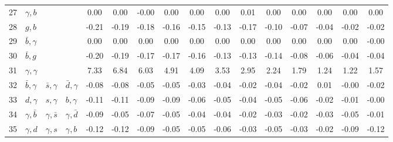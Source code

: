\begin{tabularx}{\textwidth}{rXXX@{}S@{}S@{}S@{}S@{}S@{}S@{}S@{}S@{}S@{}S@{}S@{}S}
 27 & $\gamma, b$      &                  &                 &  0.00 &  0.00 & -0.00 &  0.00 &  0.00 &  0.00 &  0.01 &  0.00 &  0.00 &  0.00 &  0.00 &  0.00 \\
 28 & $g,b$            &                  &                 & -0.21 & -0.19 & -0.18 & -0.16 & -0.15 & -0.13 & -0.17 & -0.10 & -0.07 & -0.04 & -0.02 & -0.02 \\
 29 & $\bar b,\gamma$  &                  &                 &  0.00 &  0.00 &  0.00 &  0.00 &  0.00 &  0.00 &  0.00 &  0.00 &  0.00 &  0.00 &  0.00 & -0.00 \\
 30 & $\bar b,g$       &                  &                 & -0.20 & -0.19 & -0.17 & -0.17 & -0.16 & -0.13 & -0.13 & -0.14 & -0.08 & -0.06 & -0.04 & -0.04 \\
 31 & $\gamma,\gamma$  &                  &                 &  7.33 &  6.84 &  6.03 &  4.91 &  4.09 &  3.53 &  2.95 &  2.24 &  1.79 &  1.24 &  1.22 &  1.57 \\
 32 & $\bar b,\gamma$  & $\bar s,\gamma$  & $\bar d,\gamma$ & -0.08 & -0.08 & -0.05 & -0.05 & -0.03 & -0.04 & -0.02 & -0.04 & -0.02 &  0.01 & -0.00 & -0.02 \\
 33 & $d,\gamma$       & $s,\gamma$       & $b,\gamma$      & -0.11 & -0.11 & -0.09 & -0.09 & -0.06 & -0.05 & -0.04 & -0.05 & -0.06 & -0.02 & -0.01 & -0.00 \\
 34 & $\gamma,\bar b$  & $\gamma,\bar s$  & $\gamma,\bar d$ & -0.09 & -0.05 & -0.07 & -0.05 & -0.04 & -0.04 & -0.02 & -0.03 & -0.02 & -0.03 & -0.05 & -0.01 \\
 35 & $\gamma,d$       & $\gamma,s$       & $\gamma, b$     & -0.12 & -0.12 & -0.09 & -0.05 & -0.05 & -0.06 & -0.03 & -0.05 & -0.03 & -0.02 & -0.09 & -0.12 \\
 \bottomrule
\end{tabularx}

